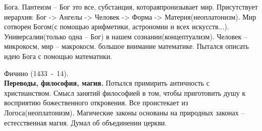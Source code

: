 \documentclass[a4paper,12pt]{report} %
\begin{document}
\begin{itemize}
\begin{enumerate}
\begin{enumerate}
     Бога. Пантеизм -- Бог это все, субстанция,
      котораяпронизывает мир. Присутствует иерархия: Бог -> Ангелы ->
      Человек -> Форма -> Материя(неоплатонизм). Мир сотворен Богом(с
      помощью арифметики, астрономии и всех
      искусств...). Универсалии(только одна -- Бог) в нашем
      сознании(концептуализм). Человек -- микрокосм, мир -- макрокосм. 
     большое внимание математике. Пытался описать идею Бога с
      помощью математики.
    \end{enumerate}
   Фичино (1433~-~14).\\
    \textbf{Переводы, философия,
    магия.} Потылся примирить античность с христианством. Смысл занятий
    философией в том, чтобы приготовить душу к восприятию божественного
    откровения. Все проистекает из Логоса(неоплатонизм). Магические
    законы основаны на природных законах -- естесственная магия. Думал
    об объединении церкви.
  \end{enumerate}

\end{itemize}
\end{document}
